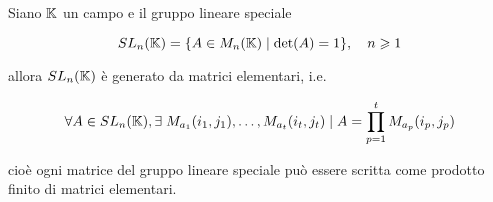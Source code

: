 \begin{theorem}
	Siano $ \mathbb{K} $ un campo e il gruppo lineare speciale
	
	\begin{equation}
		SL_{n}(\K) = \{ A \in M_{n}(\K) \mid \det(A) = 1 \} \qcomma n \geqslant 1
	\end{equation}

	allora $ SL_{n}(\mathbb{K}) $ è generato da matrici elementari, i.e.
	
	\begin{equation}
		\forall A \in SL_{n}(\mathbb{K}), \exists \; M_{a_{1}}(i_{1},j_{1}), \dots, M_{a_{t}}(i_{t},j_{t}) \mid A = \prod_{p=1}^{t} M_{a_{p}}(i_{p},j_{p})
	\end{equation}

	cioè ogni matrice del gruppo lineare speciale può essere scritta come prodotto finito di matrici elementari.
\end{theorem}

